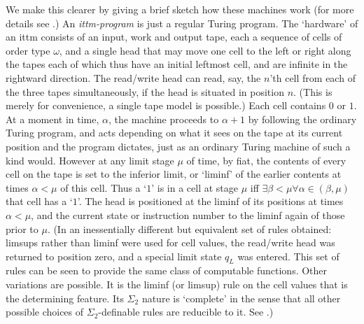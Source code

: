 \documentclass[a4paper,11pt]{amsart}
\theoremstyle{definition}
\newtheorem*{problem A}{Problem 1}
\newtheorem*{problem B}{Problem 2}
\theoremstyle{remark}
\begin{document}
We make this clearer by giving a brief sketch how these machines work (for more details see \cite{hamkins2000infinite}.) 
An {\em ittm-program} is  just a regular Turing program. %
The `hardware' of an ittm consists of an input, work and output tape, each a sequence of cells of order type $\omega$, and a single head that may move one cell to the left or right along the tapes each of which thus have an initial leftmost cell, and are infinite in the rightward direction. The read/write head can read, say, the $n$'th cell from each of the three tapes simultaneously, if the head is situated in position $n$. (This is merely for convenience, a single tape model is possible.)
Each cell contains $0$ or $1$.  At a moment in time, $\alpha$, the machine proceeds to  $\alpha+1$ by following the ordinary Turing program, and acts depending on what it sees on the tape at its current position and the program dictates, just as an ordinary Turing machine of such a kind would. 
However at any limit stage $\mu$ of time, by fiat, the contents of every cell on the tape is set to the inferior limit, or `liminf' of the earlier contents at times $\alpha < \mu$ of this cell. Thus a `$1$' is in a cell at stage $\mu$ iff $\exists \beta <\mu \forall \alpha \in (\beta,\mu)$ that cell has a `$1$'. The head is positioned at the liminf of its positions at times $\alpha <\mu$, and the current state or instruction number to the liminf again of those prior to $\mu$. (In \cite{hamkins2000infinite} an inessentially different but equivalent set of rules obtained: limsups rather than liminf were used
for cell values, the read/write head was returned to position zero, and a special limit state $q_{L}$ was entered. This set of rules can be seen to provide the same class of computable functions. Other variations are possible. It is the liminf (or limsup) rule on the cell values that is the determining feature. Its $\Sigma_{2}$ nature is `complete' in the sense that all other possible choices of $\Sigma_{2}$-definable rules are reducible to it. See \cite[Theorem 2.9]{W}.)
\end{document}

